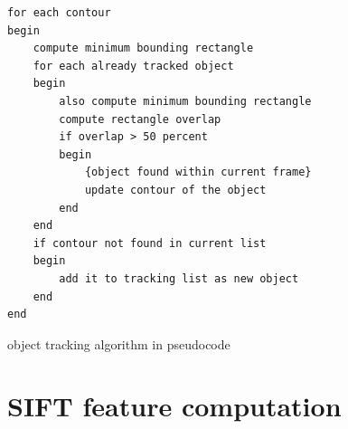 \clearpage
\begin{listing}
    \lstset{ language=Pascal, numbers=left, numberstyle=\footnotesize, 
        stepnumber=5, numbersep=5pt}
    
    \begin{lstlisting}[frame=single]
for each contour
begin
    compute minimum bounding rectangle
    for each already tracked object
    begin
        also compute minimum bounding rectangle
        compute rectangle overlap
        if overlap > 50 percent
        begin
            {object found within current frame}
            update contour of the object
        end
    end
    if contour not found in current list
    begin
        add it to tracking list as new object
    end
end
    \end{lstlisting}
    \caption{object tracking algorithm in pseudocode}
    \label{lst:tracking}
\end{listing}



\clearpage
\section{SIFT feature computation} %
\label{sg:sec:sift}

